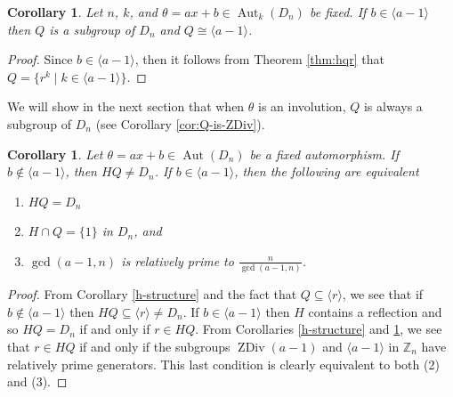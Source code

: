 \documentclass[12pt]{amsart}
\numberwithin{equation}{section}
\newtheorem{cor}[theorem]{Corollary}
\theoremstyle{definition}
\newcommand{\Aut}{\operatorname{Aut}}
\newcommand{\Z}{\mathbb{Z}}
\newcommand{\zdiv}[1]{{\operatorname{ZDiv}(#1)}}
\renewcommand{\Z}{\mathbb{Z}}
\begin{document}
\begin{cor}
\label{cor:qgroup}
Let $n$, $k$, and $\theta=ax+b\in\Aut_k(D_n)$ be fixed. If $b\in\langle a-1\rangle$ then $Q$ is a subgroup of $D_n$ and $Q\cong\langle a-1\rangle$.\end{cor}

\begin{proof}
Since $b\in\langle a-1\rangle$, then it follows from Theorem \ref{thm:hqr} that $Q=\{r^k\mid k\in\langle 
a-1\rangle\}$.
\end{proof}

We will show in the next section that when $\theta$ is an involution, $Q$ is always a subgroup of $D_n$ 
(see Corollary \ref{cor:Q-is-ZDiv}).


\begin{cor}
\label{cor:HQ-is-G}
Let $\theta=ax+b\in\Aut(D_n)$ be a fixed automorphism. If $b\not\in\langle a-1\rangle$, then $HQ\ne D_n$. If $b\in\langle a-1\rangle$, then the following are equivalent
\begin{enumerate}
\item
$HQ=D_n$
\item
$H\cap Q=\{1\}$ in $D_n$, and
\item
$\gcd(a-1,n)$ is relatively prime to $\frac{n}{\gcd(a-1,n)}$.
\end{enumerate}
\end{cor}

\begin{proof}
From Corollary \ref{h-structure} and the fact that $Q\subseteq\langle r\rangle$, we see that if $b\not\in\langle a-1\rangle$ then $HQ
\subseteq\langle r\rangle\ne D_n$. If $b\in\langle a-1\rangle$ then $H$ contains a reflection and so $HQ = D_n$ if and only if 
$r\in HQ$. From Corollaries \ref{h-structure} and \ref{cor:qgroup}, we see that $r\in HQ$ if and only if the subgroups 
$\zdiv{a-1}$ and $\langle a-1\rangle$ in $\Z_n$ have relatively prime generators. 
This last condition is clearly equivalent to both (2) and (3).
\end{proof}
\end{document}
